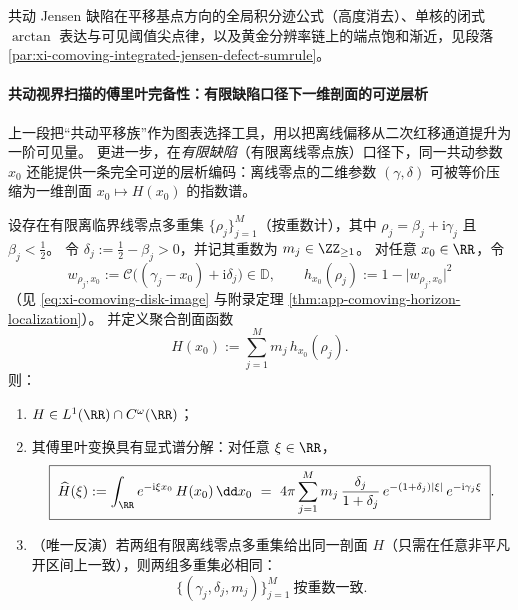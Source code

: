 
共动 Jensen 缺陷在平移基点方向的全局积分迹公式（高度消去）、单核的闭式 \(\arctan\) 表达与可见阈值尖点律，以及黄金分辨率链上的端点饱和渐近，见段落 \ref{par:xi-comoving-integrated-jensen-defect-sumrule}。







\paragraph{共动视界扫描的傅里叶完备性：有限缺陷口径下一维剖面的可逆层析}
上一段把“共动平移族”作为图表选择工具，用以把离线偏移从二次红移通道提升为一阶可见量。
更进一步，在\emph{有限缺陷}（有限离线零点族）口径下，同一共动参数 \(x_0\) 还能提供一条完全可逆的层析编码：离线零点的二维参数 \((\gamma,\delta)\) 可被等价压缩为一维剖面 \(x_0\mapsto H(x_0)\) 的指数谱。

\begin{theorem}\label{thm:xi-comoving-horizon-scan-fourier-inversion}
设存在有限离临界线零点多重集 \(\{\rho_j\}_{j=1}^{M}\)（按重数计），其中
\(
\rho_j=\beta_j+\mathrm{i}\gamma_j
\)
且 \(\beta_j<\tfrac12\)。
令 \(\delta_j:=\tfrac12-\beta_j>0\)，并记其重数为 \(m_j\in\ZZ_{\ge 1}\)。
对任意 \(x_0\in\RR\)，令
\[
w_{\rho_j,x_0}:=\mathcal{C}\bigl((\gamma_j-x_0)+\mathrm{i}\delta_j\bigr)\in\mathbb{D},
\qquad
h_{x_0}(\rho_j):=1-\bigl|w_{\rho_j,x_0}\bigr|^2
\]
（见 \eqref{eq:xi-comoving-disk-image} 与附录定理 \ref{thm:app-comoving-horizon-localization}）。
并定义聚合剖面函数
\[
H(x_0):=\sum_{j=1}^{M} m_j\,h_{x_0}(\rho_j).
\]
则：
\begin{enumerate}
  \item \(H\in L^1(\RR)\cap C^{\omega}(\RR)\)；
  \item 其傅里叶变换具有显式谱分解：对任意 \(\xi\in\RR\)，
  \begin{equation}\label{eq:xi-comoving-horizon-scan-fourier}
  \boxed{\;
  \widehat H(\xi)
  :=\int_{\RR}e^{-\mathrm{i}\xi x_0}\,H(x_0)\,\dd x_0
  ~=~
  4\pi\sum_{j=1}^{M} m_j\,\frac{\delta_j}{1+\delta_j}\,
  e^{-(1+\delta_j)|\xi|}\,e^{-\mathrm{i}\gamma_j\xi}\; }.
  \end{equation}
  \item （唯一反演）若两组有限离线零点多重集给出同一剖面 \(H\)（只需在任意非平凡开区间上一致），则两组多重集必相同：
  \[
  \{(\gamma_j,\delta_j,m_j)\}_{j=1}^{M}\ \text{按重数一致}.
  \]
\end{enumerate}
\end{theorem}

